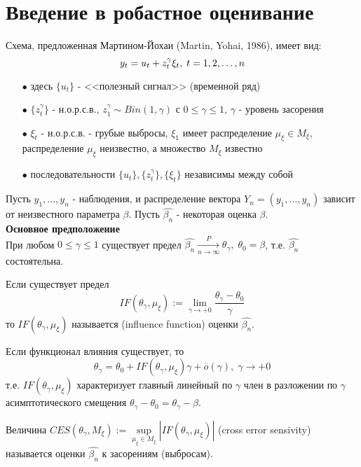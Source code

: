 \chapter{Введение в робастное оценивание}

Схема, предложенная Мартином-Йохаи (Martin, Yohai, 1986), имеет вид:
$$y_t = u_t + z_t^{\gamma} \xi_t, \; t = 1,2,\dots,n$$
\begin{itemize}
 	\item[$\bullet$] здесь $\{u_t\}$ - <<полезный сигнал>> (временной ряд)
 	\item[$\bullet$] $\{z_t^{\gamma}\}$ - н.о.р.с.в., $z_1^{\gamma} \sim Bin (1, \gamma)$ с $0 \le \gamma \le 1$, $\gamma$ - уровень засорения
 	\item[$\bullet$] $\xi_t$ - н.о.р.с.в. - грубые выбросы, $\xi_1$ имеет распределение $\mu_{\xi} \in M_{\xi}$, распределение $\mu_{\xi}$ неизвестно, а множество $M_{\xi}$ известно
 	\item[$\bullet$] последовательности $\{u_t\}, \{z_t^{\gamma}\}, \{\xi_t\}$ независимы между собой
 \end{itemize} 

 Пусть $y_1, \dots, y_n$ - наблюдения, и распределение вектора $Y_n = (y_1, \dots, y_n)$ зависит от неизвестного параметра $\beta$. Пусть $\hat{\beta_n}$ - некоторая оценка $\beta$.\\

 \textbf{Основное предположение}\\
При любом $0 \le \gamma \le 1$ существует предел $\hat{\beta_n} \xrightarrow[n \to \infty]{P}\theta_{\gamma}, \; \theta_0 = \beta$, т.е. $\hat{\beta_n}$ состоятельна.

\begin{definition}\label{lec:8/def:1}
	Если существует предел
	$$IF (\theta_{\gamma}, \mu_{\xi}) := \underset{\gamma \to +0}{\overset{}{\lim}} \frac{\theta_{\gamma} - \theta_0}{\gamma}$$
	то $IF(\theta_{\gamma}, \mu_{\xi})$ называется  (influence function) оценки $\hat{\beta_n}$.
\end{definition}

Если функционал влияния существует, то
$$\theta_{\gamma} = \theta_0 + IF (\theta_{\gamma}, \mu_{\xi}) \gamma + \overline{o}(\gamma), \; \gamma \to +0$$
т.е. $IF (\theta_{\gamma}, \mu_{\xi})$ характеризует главный линейный по $\gamma$ член в разложении по $\gamma$ асимптотического смещения $\theta_{\gamma} - \theta_0 = \theta_{\gamma} - \beta$.

\begin{definition}\label{lec:8/def:2}
	Величина $CES (\theta_{\gamma}, M_{\xi}) := \underset{\mu_{\xi} \in M_{\xi}}{\sup} |IF (\theta_{\gamma}, \mu_{\xi})|$ (cross error sensivity) называется  оценки $\hat{\beta_n}$ к засорениям (выбросам).
\end{definition}

